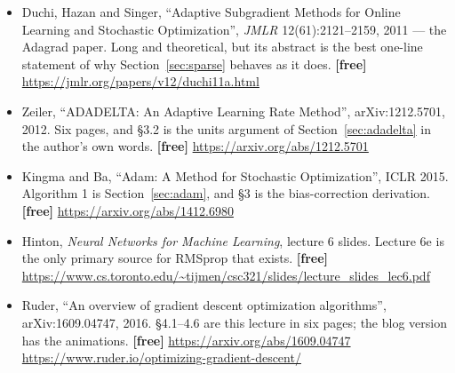 \documentclass[11pt]{article}
\begin{document}
\begin{itemize}[leftmargin=*]
  \item Duchi, Hazan and Singer, ``Adaptive Subgradient Methods for Online
    Learning and Stochastic Optimization'', \emph{JMLR} 12(61):2121--2159,
    2011 --- the Adagrad paper. Long and theoretical, but its abstract is the
    best one-line statement of why Section~\ref{sec:sparse} behaves as it does.
    \textbf{[free]} \url{https://jmlr.org/papers/v12/duchi11a.html}
  \item Zeiler, ``ADADELTA: An Adaptive Learning Rate Method'',
    arXiv:1212.5701, 2012. Six pages, and \S3.2 is the units argument of
    Section~\ref{sec:adadelta} in the author's own words. \textbf{[free]}
    \url{https://arxiv.org/abs/1212.5701}
  \item Kingma and Ba, ``Adam: A Method for Stochastic Optimization'', ICLR
    2015. Algorithm 1 is Section~\ref{sec:adam}, and \S3 is the
    bias-correction derivation. \textbf{[free]}
    \url{https://arxiv.org/abs/1412.6980}
  \item Hinton, \emph{Neural Networks for Machine Learning}, lecture 6 slides.
    Lecture 6e is the only primary source for RMSprop that exists.
    \textbf{[free]}
    \url{https://www.cs.toronto.edu/~tijmen/csc321/slides/lecture_slides_lec6.pdf}
  \item Ruder, ``An overview of gradient descent optimization algorithms'',
    arXiv:1609.04747, 2016. \S4.1--4.6 are this lecture in six pages; the blog
    version has the animations. \textbf{[free]}
    \url{https://arxiv.org/abs/1609.04747} \\
    \url{https://www.ruder.io/optimizing-gradient-descent/}
\end{itemize}

\notesources{\AMLUnitIIISources}
\end{document}
